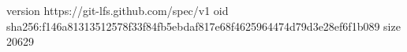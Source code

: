 version https://git-lfs.github.com/spec/v1
oid sha256:f146a81313512578f33f84fb5ebdaf817e68f4625964474d79d3e28ef6f1b089
size 20629
